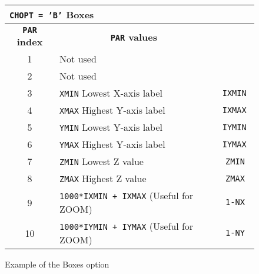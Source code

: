 \begin{figure}[p]
\begin{center}
\begin{tabular}{||c|p{}|>{\tt}r||}
\hline
\multicolumn{3}{||l||}{\bf {\tt CHOPT = 'B'} Boxes}               \\
\hline
\multicolumn{1}{||c|}{\bf {\tt PAR} index}              &
\multicolumn{1}{c|}{\bf {\tt PAR} values}               &
\multicolumn{1}{c||}{\bf default}                                 \\
\hline
 1  & Not used                                                      &         \\
 2  & Not used                                                      &         \\
 3  & {\tt XMIN} Lowest X-axis label                                &   IXMIN \\
 4  & {\tt XMAX} Highest Y-axis label                               &   IXMAX \\
 5  & {\tt YMIN} Lowest Y-axis label                                &   IYMIN \\
 6  & {\tt YMAX} Highest Y-axis label                               &   IYMAX \\
 7  & {\tt ZMIN} Lowest Z value                                     &   ZMIN  \\
 8  & {\tt ZMAX} Highest Z value                                    &   ZMAX  \\
 9  & {\tt 1000*IXMIN + IXMAX} (Useful for ZOOM)                    &   1-NX  \\
 10 & {\tt 1000*IYMIN + IYMAX} (Useful for ZOOM)                    &   1-NY  \\
\hline
\end{tabular}
\end{center}

\bigskip

\begin{center} \mbox{} \end{center}
\caption{Example of the \protect{} Boxes option}
\label{BOXES}
\end{figure}

